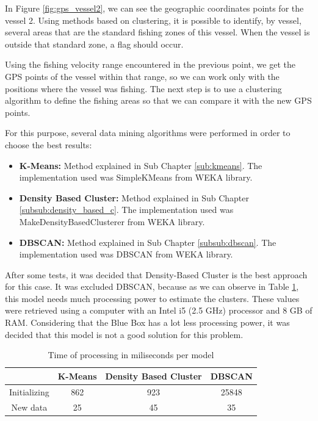 In Figure \ref{fig:gps_vessel2}, we can see the geographic coordinates points for the vessel 2. Using methods based on clustering, it is possible to identify, by vessel, several areas that are the standard fishing zones of this vessel. When the vessel is outside that standard zone, a flag should occur.

Using the fishing velocity range encountered in the previous point, we get the GPS points of the vessel within that range, so we can work only with the positions where the vessel was fishing. The next step is to use a clustering algorithm to define the fishing areas so that we can compare it with the new GPS points. 

For this purpose, several data mining algorithms were performed in order to choose the best results:

\begin{itemize}
\item \textbf{K-Means:} Method explained in Sub Chapter \ref{sub:kmeans}. The implementation used was SimpleKMeans from WEKA library.


\item \textbf{Density Based Cluster:} Method explained in Sub Chapter \ref{subsub:density_based_c}. The implementation used was MakeDensityBasedClusterer from WEKA library.
 

\item \textbf{DBSCAN:} Method explained in Sub Chapter \ref{subsub:dbscan}. The implementation used was DBSCAN from WEKA library.

\end{itemize}

After some tests, it was decided that Density-Based Cluster is the best approach for this case. It was excluded DBSCAN, because as we can observe in Table \ref{table:mill_per_moodle}, this model needs much processing power to estimate the clusters. These values were retrieved using a computer with an Intel i5 (2.5 GHz) processor and 8 GB of RAM. Considering that the Blue Box has a lot less processing power, it was decided that this model is not a good solution for this problem.
\\

\begin {table}[h]
\caption {Time of processing in miliseconds per model}
\begin{center}
\begin{tabular}{c|c|c|c}
& \textbf{K-Means} & \textbf{Density Based Cluster} & \textbf{DBSCAN} \\
\hline
Initializing & 862 & 923 & 25848 \\

New data & 25 & 45 & 35 
\label{table:mill_per_moodle}
\end{tabular}
\end{center}
\end {table}

